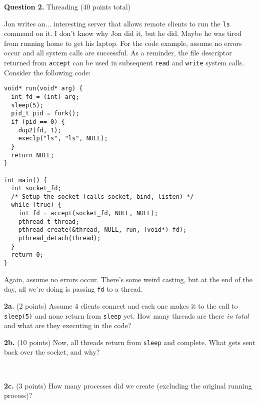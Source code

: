 \documentclass[12pt]{article}
\begin{document}
\newpage

\textbf{Question 2.} Threading (40 points total)

\vspace{1em}

Jon writes an... interesting server that allows remote clients to run the
\texttt{ls} command on it.
I don't know why Jon did it, but he did.
Maybe he was tired from running home to get his laptop.
For the code example, assume no errors occur and all system calls are
successful.
As a reminder, the file descriptor returned from \texttt{accept} can be used
in subsequent \texttt{read} and \texttt{write} system calls.
Consider the following code:

\vspace{1em}

\begin{lstlisting}
void* run(void* arg) {
  int fd = (int) arg;
  sleep(5);
  pid_t pid = fork();
  if (pid == 0) {
    dup2(fd, 1);
    execlp("ls", "ls", NULL);
  }
  return NULL;
}

int main() {
  int socket_fd;
  /* Setup the socket (calls socket, bind, listen) */
  while (true) {
    int fd = accept(socket_fd, NULL, NULL);
    pthread_t thread;
    pthread_create(&thread, NULL, run, (void*) fd);
    pthread_detach(thread);
  }
  return 0;
}
\end{lstlisting}

\vspace{1em}

Again, assume no errors occur.
There's some weird casting, but at the end of the day, all we're doing is
passing \texttt{fd} to a thread.

\vspace{1em}

\textbf{2a.} (2 points)
Assume 4 clients connect and each one makes it to the call to \texttt{sleep(5)}
and none return from \texttt{sleep} yet.
How many threads are there \textit{in total} and what are they executing in the
code?

\vspace{3em}

\textbf{2b.} (10 points)
Now, all threads return from \texttt{sleep} and complete.
What gets sent back over the socket, and why?

\newpage

\ 

\vspace{7em}

\textbf{2c.} (3 points)
How many processes did we create (excluding the original running process)?
\end{document}
